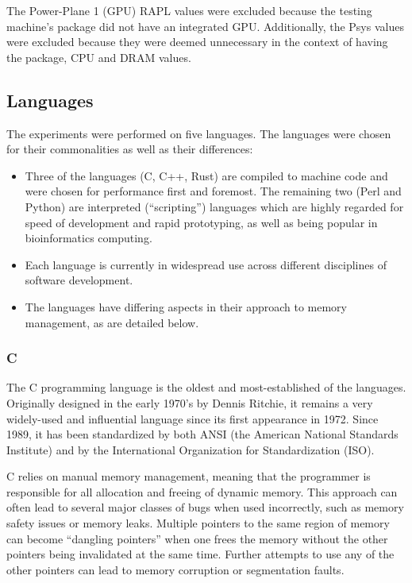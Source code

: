 The Power-Plane 1 (GPU) RAPL values were excluded because the testing machine's package did not have an integrated GPU. Additionally, the Psys values were excluded because they were deemed unnecessary in the context of having the package, CPU and DRAM values.

\subsection{Languages}

The experiments were performed on five languages. The languages were chosen for their commonalities as well as their differences:

\begin{itemize}
\item Three of the languages (C, C++, Rust) are compiled to machine code and were chosen for performance first and foremost. The remaining two (Perl and Python) are interpreted (``scripting'') languages which are highly regarded for speed of development and rapid prototyping, as well as being popular in bioinformatics computing.
\item Each language is currently in widespread use across different disciplines of software development.
\item The languages have differing aspects in their approach to memory management, as are detailed below.
\end{itemize}

\subsubsection{C}

The C programming language is the oldest and most-established of the languages. Originally designed in the early 1970's by Dennis Ritchie, it remains a very widely-used and influential language since its first appearance in 1972. Since 1989, it has been standardized by both ANSI (the American National Standards Institute) and by the International Organization for Standardization (ISO).

C relies on manual memory management, meaning that the programmer is responsible for all allocation and freeing of dynamic memory. This approach can often lead to several major classes of bugs when used incorrectly, such as memory safety issues or memory leaks. Multiple pointers to the same region of memory can become ``dangling pointers'' when one frees the memory without the other pointers being invalidated at the same time. Further attempts to use any of the other pointers can lead to memory corruption or segmentation faults.

